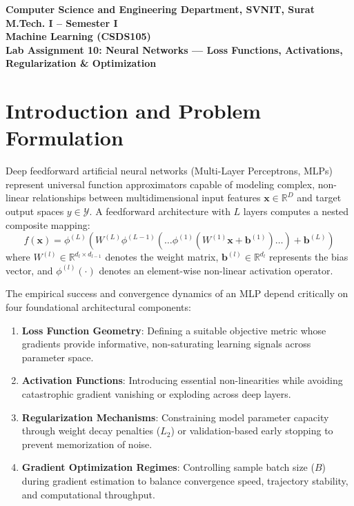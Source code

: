 \documentclass[12pt]{article}
\begin{document}

\begin{center}
\textbf{Computer Science and Engineering Department, SVNIT, Surat}\\
\textbf{M.Tech. I -- Semester I}\\
\textbf{Machine Learning (CSDS105)}\\
\textbf{Lab Assignment 10: Neural Networks --- Loss Functions, Activations, Regularization \& Optimization}
\end{center}

\vspace{0.3cm}

\section{Introduction and Problem Formulation}

Deep feedforward artificial neural networks (Multi-Layer Perceptrons, MLPs) represent universal function approximators capable of modeling complex, non-linear relationships between multidimensional input features $\mathbf{x} \in \mathbb{R}^D$ and target output spaces $y \in \mathcal{Y}$. A feedforward architecture with $L$ layers computes a nested composite mapping:
\begin{equation}
f(\mathbf{x}) = \phi^{(L)} \left( W^{(L)} \phi^{(L-1)} \left( \dots \phi^{(1)} \left( W^{(1)} \mathbf{x} + \mathbf{b}^{(1)} \right) \dots \right) + \mathbf{b}^{(L)} \right)
\end{equation}
where $W^{(l)} \in \mathbb{R}^{d_l \times d_{l-1}}$ denotes the weight matrix, $\mathbf{b}^{(l)} \in \mathbb{R}^{d_l}$ represents the bias vector, and $\phi^{(l)}(\cdot)$ denotes an element-wise non-linear activation operator.

The empirical success and convergence dynamics of an MLP depend critically on four foundational architectural components:
\begin{enumerate}
    \item \textbf{Loss Function Geometry}: Defining a suitable objective metric whose gradients provide informative, non-saturating learning signals across parameter space.
    \item \textbf{Activation Functions}: Introducing essential non-linearities while avoiding catastrophic gradient vanishing or exploding across deep layers.
    \item \textbf{Regularization Mechanisms}: Constraining model parameter capacity through weight decay penalties ($L_2$) or validation-based early stopping to prevent memorization of noise.
    \item \textbf{Gradient Optimization Regimes}: Controlling sample batch size ($B$) during gradient estimation to balance convergence speed, trajectory stability, and computational throughput.
\end{enumerate}
\end{document}
